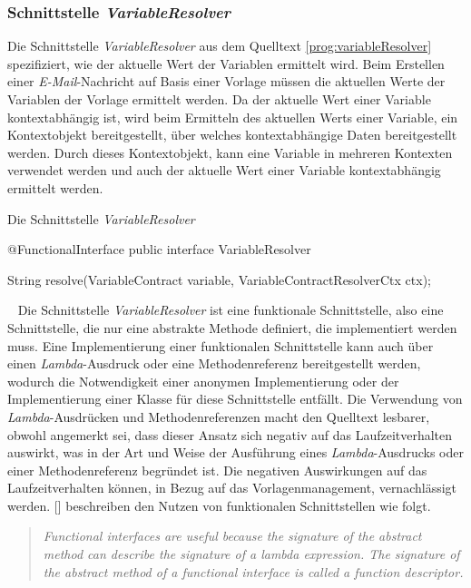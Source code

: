 \subsubsection{Schnittstelle \emph{VariableResolver}}
\label{sec:variableResolver}
Die Schnittstelle \emph{VariableResolver} aus dem Quelltext  \ref{prog:variableResolver} spezifiziert, wie der aktuelle Wert der Variablen ermittelt wird. 
\newline
\newline
Beim Erstellen einer \emph{E-Mail}-Nachricht auf Basis einer Vorlage müssen die aktuellen Werte der Variablen der Vorlage ermittelt werden. Da der aktuelle Wert einer Variable kontextabhängig ist, wird beim Ermitteln des aktuellen Werts einer Variable, ein Kontextobjekt bereitgestellt, über welches kontextabhängige Daten bereitgestellt werden. Durch dieses Kontextobjekt, kann eine Variable in mehreren Kontexten verwendet werden und auch der aktuelle Wert einer Variable kontextabhängig ermittelt werden.
\begin{program}[h]
\caption{Die Schnittstelle \emph{VariableResolver}}
\label{prog:variableResolver}
\begin{JavaCode}
@FunctionalInterface
public interface VariableResolver {

    String resolve(VariableContract variable,
                   VariableContractResolverCtx ctx);
                   
}
\end{JavaCode}
\end{program}
\ \newline
Die Schnittstelle \emph{VariableResolver} ist eine funktionale Schnittstelle, also eine Schnittstelle, die nur eine abstrakte Methode definiert, die implementiert werden muss. Eine Implementierung einer funktionalen Schnittstelle kann auch über einen \emph{Lambda}-Ausdruck oder eine Methodenreferenz bereitgestellt werden, wodurch die Notwendigkeit einer anonymen Implementierung oder der Implementierung einer Klasse für diese Schnittstelle entfällt. Die Verwendung von \emph{Lambda}-Ausdrücken und Methodenreferenzen macht den Quelltext lesbarer, obwohl angemerkt sei, dass dieser Ansatz sich negativ auf das Laufzeitverhalten auswirkt, was in der Art und Weise der Ausführung eines \emph{Lambda}-Ausdrucks oder einer Methodenreferenz begründet ist. Die negativen Auswirkungen auf das Laufzeitverhalten können, in Bezug auf das Vorlagenmanagement, vernachlässigt werden. [\cite[50]{java8InAction}] beschreiben den Nutzen von funktionalen Schnittstellen wie folgt.
\begin{quote}
\emph{Functional interfaces are useful because the signature of the abstract method can describe the signature of a lambda expression. The signature of the abstract method of a functional interface is called a function descriptor.}
\end{quote}

